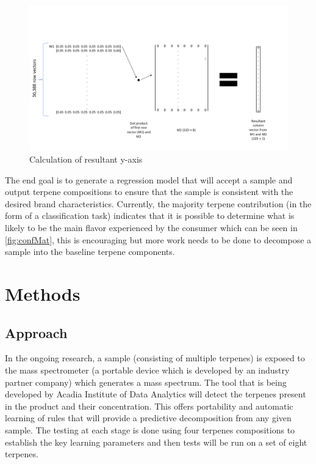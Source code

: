 \documentclass[12pt, a4paper]{article}
\begin{document}
\begin{figure}[!ht]
\centering
    \begin{center}
        \includegraphics[width=16.2cm]{datarepresentation.png}
    \end{center}
    \caption{Calculation of resultant y-axis}
    \label{fig:dataRepresentation}
\end{figure}

The end goal is to generate a regression model that will accept a sample and output terpene compositions to ensure that the sample is consistent with the desired brand characteristics. Currently, the majority terpene contribution (in the form of a classification task) indicates that it is possible to determine what is likely to be the main flavor experienced by the consumer which can be seen in \ref{fig:confMat}, this is encouraging but more work needs to be done to decompose a sample into the baseline terpene components.


\section{Methods}
\subsection{Approach}
In the ongoing research, a sample (consisting of multiple terpenes) is exposed to the mass spectrometer (a portable device which is developed by an industry partner company) which generates a mass spectrum. The tool that is being developed by Acadia Institute of Data Analytics will detect the terpenes present in the product and their concentration. This offers portability and automatic learning of rules that will provide a predictive decomposition from any given sample. The testing at each stage is done using four terpenes compositions to establish the key learning parameters and then tests will be run on a set of eight terpenes.
\end{document}

